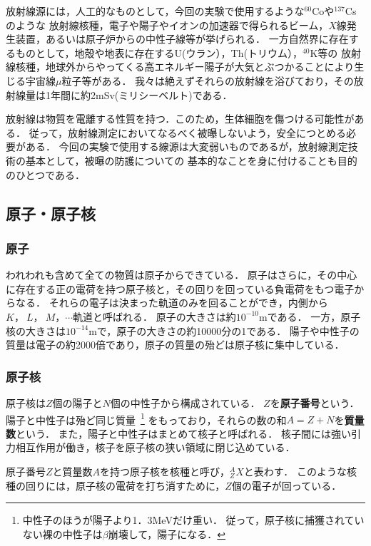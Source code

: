 \documentclass[a4j,10pt,oneside,openany]{jsbook}
\begin{document}
放射線源には，人工的なものとして，今回の実験で使用するような$^{60}$Coや$^{137}$Csのような
放射線核種，電子や陽子やイオンの加速器で得られるビーム，$X$線発生装置，あるいは原子炉からの中性子線等が挙げられる．
一方自然界に存在するものとして，地殻や地表に存在するU(ウラン），Th(トリウム），$^{40}$K等の
放射線核種，地球外からやってくる高エネルギー陽子が大気とぶつかることにより生じる宇宙線$\mu$粒子等がある．
我々は絶えずそれらの放射線を浴びており，その放射線量は1年間に約2mSv(ミリシーベルト)である．

放射線は物質を電離する性質を持つ．このため，生体細胞を傷つける可能性がある．
従って，放射線測定においてなるべく被曝しないよう，安全につとめる必要がある．
今回の実験で使用する線源は大変弱いものであるが，放射線測定技術の基本として，被曝の防護についての
基本的なことを身に付けることも目的のひとつである．

\subsection{原子・原子核}

\subsubsection{原子}

われわれも含めて全ての物質は原子からできている．
原子はさらに，その中心に存在する正の電荷を持つ原子核と，その回りを回っている負電荷をもつ電子からなる．
それらの電子は決まった軌道のみを回ることができ，内側から$K，~L，~M，\cdots$軌道と呼ばれる．
原子の大きさは約$10^{-10}$mである．
一方，原子核の大きさは$10^{-14}$mで，原子の大きさの約10000分の1である．
陽子や中性子の質量は電子の約2000倍であり，原子の質量の殆どは原子核に集中している．

\subsubsection{原子核}

原子核は$Z$個の陽子と$N$個の中性子から構成されている．
$Z$を{\bf 原子番号}という．
陽子と中性子は殆ど同じ質量~\footnote{中性子のほうが陽子より1．3MeVだけ重い．
従って，原子核に捕獲されていない裸の中性子は$\beta$崩壊して，陽子になる．}
をもっており，それらの数の和$A=Z+N$を{\bf 質量数}という．
また，陽子と中性子はまとめて核子と呼ばれる．
核子間には強い引力相互作用が働き，核子を原子核の狭い領域に閉じ込めている．

原子番号$Z$と質量数$A$を持つ原子核を核種と呼び，$^{A}_Z X$と表わす．
このような核種の回りには，原子核の電荷を打ち消すために，$Z$個の電子が回っている．
\end{document}
